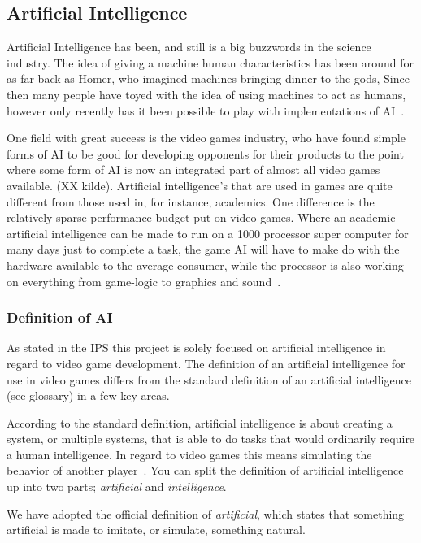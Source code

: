 

\subsection{Artificial Intelligence} \label{sec:ai}
Artificial Intelligence has been, and still is a big buzzwords in the science industry.
The idea of giving a machine human characteristics has been around for as far back as Homer, who imagined machines bringing dinner to the gods, Since then many people have toyed with the idea of using machines to act as humans, however only recently has it been possible to play with implementations of AI~\autocite{Buchanan2006}.

One field with great success is the video games industry, who have found simple forms of AI to be good for developing opponents for their products to the point where some form of AI is now an integrated part of almost all video games available. (XX kilde).
Artificial intelligence's that are used in games are quite different from those used in, for instance, academics.
One difference is the relatively sparse performance budget put on video games.
Where an academic artificial intelligence can be made to run on a 1000 processor super computer for many days just to complete a task, the game AI will have to make do with the hardware available to the average consumer, while the processor is also working on everything from game-logic to graphics and sound~\autocite{Buckland2005}.

\subsubsection{Definition of AI}
As stated in the IPS this project is solely focused on artificial intelligence in regard to video game development.
The definition of an artificial intelligence for use in video games differs from the standard definition of an artificial intelligence (see glossary) in a few key areas.

According to the standard definition, artificial intelligence is about creating a system, or multiple systems, that is able to do tasks that would ordinarily require a human intelligence. In regard to video games this means simulating the behavior of another player~\autocite{Kehoe2009}.
You can split the definition of artificial intelligence up into two parts; \emph{artificial} and \emph{intelligence}.

We have adopted the official definition of \emph{artificial}\autocite{artificial2014}, which states that something artificial is made to imitate, or simulate, something natural.

